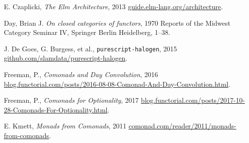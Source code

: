 \documentclass[nocopyrightspace]{sigplanconf}
\begin{document}
\begin{thebibliography}{10}
\softraggedright

E. Czaplicki, \emph{The Elm Architecture}, 2013
\newblock \url{guide.elm-lang.org/architecture}.

Day, Brian J.
\newblock \emph{On closed categories of functors}, 1970
\newblock Reports of the Midwest Category Seminar IV, Springer Berlin Heidelberg, 1--38.

J. De Goes, G. Burgess, et al.,
\newblock \texttt{purescript-halogen}, 2015
\newblock \url{github.com/slamdata/purescript-halogen}.

Freeman, P., \emph{Comonads and Day Convolution}, 2016
\newblock \url{blog.functorial.com/posts/2016-08-08-Comonad-And-Day-Convolution.html}.

Freeman, P., \emph{Comonads for Optionality}, 2017
\newblock \url{blog.functorial.com/posts/2017-10-28-Comonads-For-Optionality.html}.

E. Kmett, \emph{Monads from Comonads}, 2011
\newblock \url{comonad.com/reader/2011/monads-from-comonads}.

\end{thebibliography}
\end{document}
